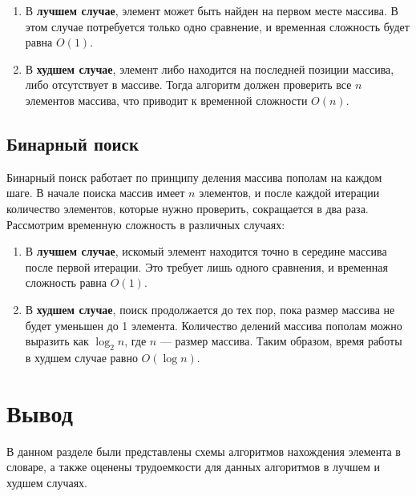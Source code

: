 \begin{enumerate}[label=\arabic*.]
    \item В \textbf{лучшем случае}, элемент может быть найден на первом месте массива. В этом случае потребуется только одно сравнение, и временная сложность будет равна $O(1)$.
    \item В \textbf{худшем случае}, элемент либо находится на последней позиции массива, либо отсутствует в массиве. Тогда алгоритм должен проверить все $n$ элементов массива, что приводит к временной сложности $O(n)$.
\end{enumerate}

\subsection{Бинарный поиск}

Бинарный поиск работает по принципу деления массива пополам на каждом шаге. В начале поиска массив имеет $n$ элементов, и после каждой итерации количество элементов, которые нужно проверить, сокращается в два раза. Рассмотрим временную сложность в различных случаях:

\begin{enumerate}[label=\arabic*.]
    \item В \textbf{лучшем случае}, искомый элемент находится точно в середине массива после первой итерации. Это требует лишь одного сравнения, и временная сложность равна $O(1)$.
    \item В \textbf{худшем случае}, поиск продолжается до тех пор, пока размер массива не будет уменьшен до 1 элемента. Количество делений массива пополам можно выразить как $\log_2{n}$, где $n$ — размер массива. Таким образом, время работы в худшем случае равно $O(\log n)$.
\end{enumerate}

\section*{Вывод}
В данном разделе были представлены схемы алгоритмов нахождения элемента в словаре, а также оценены трудоемкости для данных алгоритмов в лучшем и худшем случаях.

